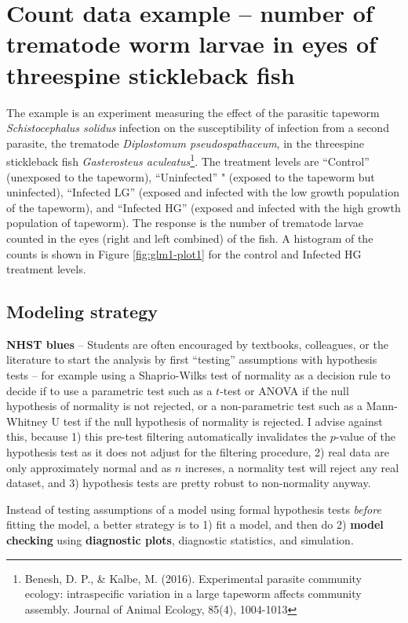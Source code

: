 \documentclass[]{book}
\let\rmarkdownfootnote\footnote%
\def\footnote{\protect\rmarkdownfootnote}
\begin{document}
\section{Count data example -- number of trematode worm larvae in eyes
of threespine stickleback
fish}\label{count-data-example-number-of-trematode-worm-larvae-in-eyes-of-threespine-stickleback-fish}

The example is an experiment measuring the effect of the parasitic
tapeworm \emph{Schistocephalus solidus} infection on the susceptibility
of infection from a second parasite, the trematode \emph{Diplostomum
pseudospathaceum}, in the threespine stickleback fish \emph{Gasterosteus
aculeatus}\footnote{Benesh, D. P., \& Kalbe, M. (2016). Experimental
  parasite community ecology: intraspecific variation in a large
  tapeworm affects community assembly. Journal of Animal Ecology, 85(4),
  1004-1013}. The treatment levels are ``Control'' (unexposed to the
tapeworm), ``Uninfected'' " (exposed to the tapeworm but uninfected),
``Infected LG'' (exposed and infected with the low growth population of
the tapeworm), and ``Infected HG'' (exposed and infected with the high
growth population of tapeworm). The response is the number of trematode
larvae counted in the eyes (right and left combined) of the fish. A
histogram of the counts is shown in Figure \ref{fig:glm1-plot1} for the
control and Infected HG treatment levels.

\subsection{Modeling strategy}\label{modeling-strategy-1}

\textbf{NHST blues} -- Students are often encouraged by textbooks,
colleagues, or the literature to start the analysis by first ``testing''
assumptions with hypothesis tests -- for example using a Shaprio-Wilks
test of normality as a decision rule to decide if to use a parametric
test such as a \(t\)-test or ANOVA if the null hypothesis of normality
is not rejected, or a non-parametric test such as a Mann-Whitney U test
if the null hypothesis of normality is rejected. I advise against this,
because 1) this pre-test filtering automatically invalidates the
\(p\)-value of the hypothesis test as it does not adjust for the
filtering procedure, 2) real data are only approximately normal and as
\(n\) increses, a normality test will reject any real dataset, and 3)
hypothesis tests are pretty robust to non-normality anyway.

Instead of testing assumptions of a model using formal hypothesis tests
\emph{before} fitting the model, a better strategy is to 1) fit a model,
and then do 2) \textbf{model checking} using \textbf{diagnostic plots},
diagnostic statistics, and simulation.
\end{document}
